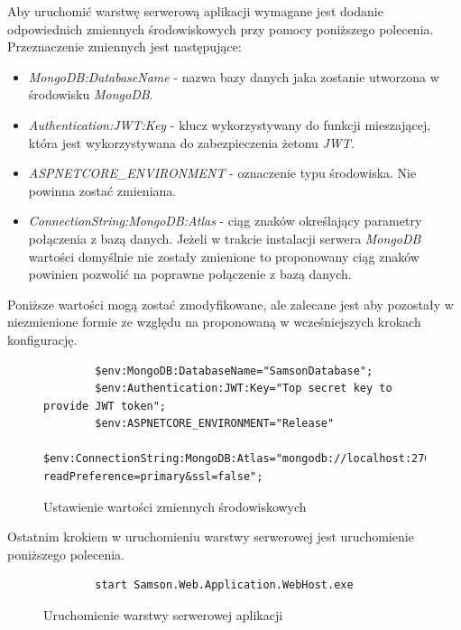 \documentclass[a4paper,twoside,12pt]{book}
\begin{document}
Aby uruchomić warstwę serwerową aplikacji wymagane jest dodanie odpowiednich zmiennych środowiskowych przy pomocy poniższego polecenia. Przeznaczenie zmiennych jest następujące:
\begin{itemize}
	\item \textit{MongoDB:DatabaseName} - nazwa bazy danych jaka zostanie utworzona w środowisku \textit{MongoDB}.
	\item \textit{Authentication:JWT:Key} - klucz wykorzystywany do funkcji mieszającej, która jest wykorzystywana do zabezpieczenia żetonu \textit{JWT}.
	\item \textit{ASPNETCORE\_ENVIRONMENT} - oznaczenie typu środowiska. Nie powinna zostać zmieniana.
	\item \textit{ConnectionString:MongoDB:Atlas} - ciąg znaków określający parametry połączenia z bazą danych. Jeżeli w trakcie instalacji serwera \textit{MongoDB} wartości domyślnie nie zostały zmienione to proponowany ciąg znaków powinien pozwolić na poprawne połączenie z bazą danych.
\end{itemize}
Poniższe wartości mogą zostać zmodyfikowane, ale zalecane jest aby pozostały w niezmienione formie ze względu na proponowaną w wcześniejszych krokach konfigurację.
\begin{figure} [H]
	\centering
	\begin{lstlisting}
		$env:MongoDB:DatabaseName="SamsonDatabase";
		$env:Authentication:JWT:Key="Top secret key to provide JWT token";
		$env:ASPNETCORE_ENVIRONMENT="Release"
		$env:ConnectionString:MongoDB:Atlas="mongodb://localhost:27017/?readPreference=primary&ssl=false";
	\end{lstlisting}
	\caption{Ustawienie wartości zmiennych środowiskowych}
	\label{fig:varEnvironment}
\end{figure}

Ostatnim krokiem w uruchomieniu warstwy serwerowej jest uruchomienie poniższego polecenia.
\begin{figure} [H]
	\centering
	\begin{lstlisting}
		start Samson.Web.Application.WebHost.exe
	\end{lstlisting}
	\caption{Uruchomienie warstwy serwerowej aplikacji}
	\label{fig:aspNetRun}
\end{figure}
\end{document}
